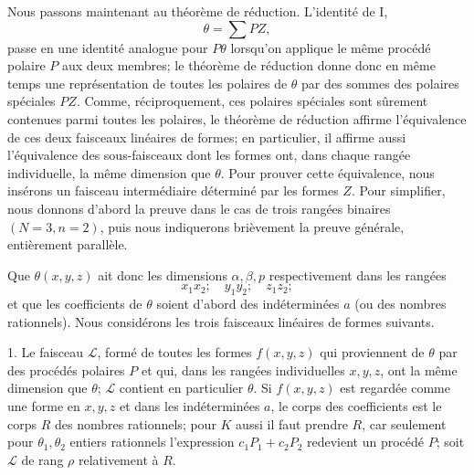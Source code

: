 Nous passons maintenant au théorème de réduction. L'identité de I,
\[
  \theta=\sum PZ,
\]
passe en une identité analogue pour $P\theta$ lorsqu'on applique le même procédé polaire $P$ aux deux membres; le théorème de réduction donne donc en même temps une représentation de toutes les polaires de $\theta$ par des sommes des polaires spéciales $PZ$. Comme, réciproquement, ces polaires spéciales sont sûrement contenues parmi toutes les polaires, le théorème de réduction affirme l'équivalence de ces deux faisceaux linéaires de formes; en particulier, il affirme aussi l'équivalence des sous-faisceaux dont les formes ont, dans chaque rangée individuelle, la même dimension que $\theta$. Pour prouver cette équivalence, nous insérons un faisceau intermédiaire déterminé par les formes $Z$. Pour simplifier, nous donnons d'abord la preuve dans le cas de trois rangées binaires $(N=3,n=2)$, puis nous indiquerons brièvement la preuve générale, entièrement parallèle.

Que $\theta(x,y,z)$ ait donc les dimensions $\alpha,\beta,p$ respectivement dans les rangées
\[
  x_1x_2;\quad y_1y_2;\quad z_1z_2;
\]
et que les coefficients de $\theta$ soient d'abord des indéterminées $a$ (ou des nombres rationnels). Nous considérons les trois faisceaux linéaires de formes suivants.

1. Le faisceau $\mathcal L$, formé de toutes les formes $f(x,y,z)$ qui proviennent de $\theta$ par des procédés polaires $P$ et qui, dans les rangées individuelles $x,y,z$, ont la même dimension que $\theta$; $\mathcal L$ contient en particulier $\theta$. Si $f(x,y,z)$ est regardée comme une forme en $x,y,z$ et dans les indéterminées $a$, le corps des coefficients est le corps $R$ des nombres rationnels; pour $K$ aussi il faut prendre $R$, car seulement pour $\theta_1,\theta_2$ entiers rationnels l'expression $c_1P_1+c_2P_2$ redevient un procédé $P$; soit $\mathcal L$ de rang $\rho$ relativement à $R$.

